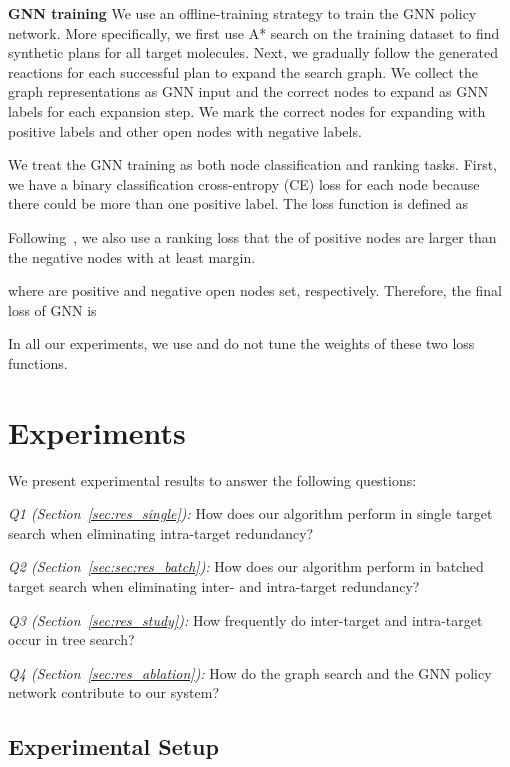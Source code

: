 \documentclass[sigconf]{acmart}
\begin{document}
\noindent\textbf{GNN training}
We use an offline-training strategy to train the GNN policy network.
More specifically, we first use A* search on the training dataset to find synthetic plans for all target molecules.
Next, we gradually follow the generated reactions for each successful plan to expand the search graph.
We collect the graph representations as GNN input and the correct nodes to expand as GNN labels for each expansion step.  
We mark the correct nodes for expanding with positive labels and other open nodes with negative labels.

We treat the GNN training as both node classification and ranking tasks.
First, we have a binary classification cross-entropy (CE) loss for each node because there could be more than one positive label.
The loss function is defined as


Following~\citet{Chen2020}, we also use a ranking loss that the  of positive nodes are larger than the negative nodes with at least  margin.

where  are positive and negative open nodes set, respectively.
Therefore, the final loss of GNN is 

In all our experiments, we use  and do not tune the weights of these two loss functions.



\section{Experiments}
We present experimental results to answer the following questions:

\noindent\textit{Q1 (Section~\ref{sec:res_single}):} How does our algorithm perform in single target search when eliminating intra-target redundancy?

\noindent\textit{Q2 (Section~\ref{sec:sec:res_batch}):} How does our algorithm perform in batched target search when eliminating inter- and intra-target redundancy?

\noindent\textit{Q3 (Section~\ref{sec:res_study}):} How frequently do inter-target and intra-target occur in tree search?

\noindent\textit{Q4 (Section~\ref{sec:res_ablation}):} 
How do the graph search and the GNN policy network contribute to our system?


\subsection{Experimental Setup}\label{sec:exp_setup}
\end{document}
